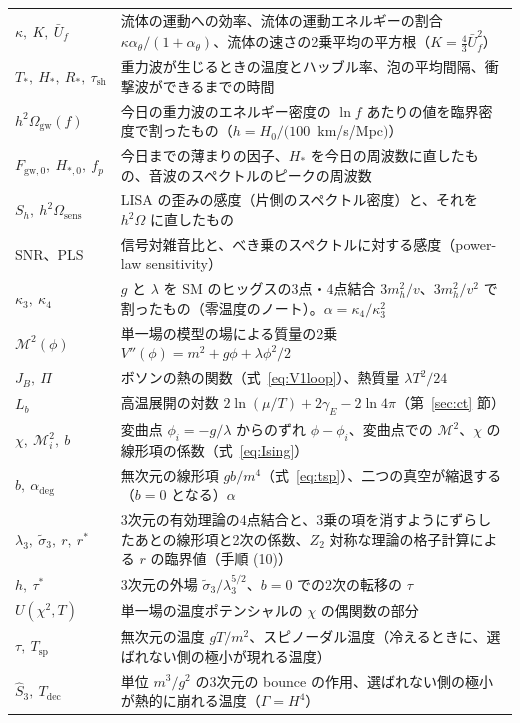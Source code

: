\documentclass[a4paper,10pt]{ltjsarticle}
\begin{document}
\begin{table}[tbp]
\begin{tabularx}{\linewidth}{>{\raggedright\arraybackslash}p{3.6cm}X}
$\kappa,\ K,\ \bar U_f$ & 流体の運動への効率、流体の運動エネルギーの割合 $\kappa\alpha_\theta/(1+\alpha_\theta)$、流体の速さの2乗平均の平方根（$K=\frac43\bar U_f^2$） \\
$T_*,\ H_*,\ R_*,\ \tau_{\mathrm{sh}}$ & 重力波が生じるときの温度とハッブル率、泡の平均間隔、衝撃波ができるまでの時間 \\
$h^2\Omega_{\mathrm{gw}}(f)$ & 今日の重力波のエネルギー密度の $\ln f$ あたりの値を臨界密度で割ったもの（$h=H_0/(100$~km/s/Mpc$)$） \\
$F_{\mathrm{gw},0},\ H_{*,0},\ f_p$ & 今日までの薄まりの因子、$H_*$ を今日の周波数に直したもの、音波のスペクトルのピークの周波数 \\
$S_h,\ h^2\Omega_{\mathrm{sens}}$ & LISA の歪みの感度（片側のスペクトル密度）と、それを $h^2\Omega$ に直したもの \\
SNR、PLS & 信号対雑音比と、べき乗のスペクトルに対する感度（power-law sensitivity） \\
$\kappa_3,\ \kappa_4$ & $g$ と $\lambda$ を SM のヒッグスの3点・4点結合 $3m_h^2/v$、$3m_h^2/v^2$ で割ったもの（零温度のノート）。$\alpha=\kappa_4/\kappa_3^2$ \\
$\mathcal M^2(\phi)$ & 単一場の模型の場による質量の2乗 $V''(\phi)=m^2+g\phi+\lambda\phi^2/2$ \\
$J_B,\ \Pi$ & ボソンの熱の関数（式~\eqref{eq:V1loop}）、熱質量 $\lambda T^2/24$ \\
$L_b$ & 高温展開の対数 $2\ln(\mu/T)+2\gamma_E-2\ln4\pi$（第~\ref{sec:ct} 節） \\
$\chi,\ \mathcal M_i^2,\ b$ & 変曲点 $\phi_i=-g/\lambda$ からのずれ $\phi-\phi_i$、変曲点での $\mathcal M^2$、$\chi$ の線形項の係数（式~\eqref{eq:Ising}） \\
$\hat b,\ \alpha_{\mathrm{deg}}$ & 無次元の線形項 $gb/m^4$（式~\eqref{eq:tsp}）、二つの真空が縮退する（$b=0$ となる）$\alpha$ \\
$\lambda_3,\ \tilde\sigma_3,\ r,\ r^*$ & 3次元の有効理論の4点結合と、3乗の項を消すようにずらしたあとの線形項と2次の係数、$Z_2$ 対称な理論の格子計算による $r$ の臨界値（手順 (10)） \\
$h,\ \tau^*$ & 3次元の外場 $\tilde\sigma_3/\lambda_3^{5/2}$、$b=0$ での2次の転移の $\tau$ \\
$U(\chi^2,T)$ & 単一場の温度ポテンシャルの $\chi$ の偶関数の部分 \\
$\tau,\ T_{\mathrm{sp}}$ & 無次元の温度 $gT/m^2$、スピノーダル温度（冷えるときに、選ばれない側の極小が現れる温度） \\
$\hat S_3,\ T_{\mathrm{dec}}$ & 単位 $m^3/g^2$ の3次元の bounce の作用、選ばれない側の極小が熱的に崩れる温度（$\Gamma=H^4$） \\
\bottomrule
\end{tabularx}
\end{table}
\end{document}
